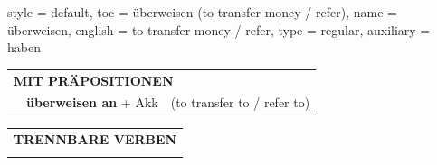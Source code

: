 \begin{verbentry}{
  style = {default},
  toc = {überweisen (to transfer money / refer)},
  name = {überweisen},
  english = {to transfer money / refer},
  type = {regular},
  auxiliary = {haben}
}
\vspace{10pt}

\begin{tabular}{lll}
\multicolumn{3}{l}{\textbf{MIT PRÄPOSITIONEN}}\\
& \textbf{überweisen an} + Akk & (to transfer to / refer to)\\
\end{tabular}
\hfill
\begin{tabular}{lll}
\multicolumn{3}{l}{\textbf{TRENNBARE VERBEN}}\\
\vspace{10pt}\\
\end{tabular}
\vspace{-5pt}
\end{verbentry}


